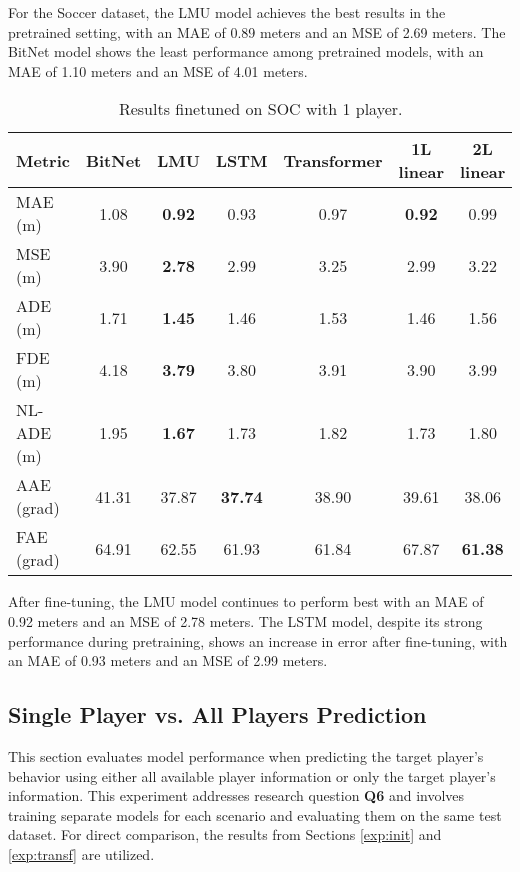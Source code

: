 For the Soccer dataset, the LMU model achieves the best results in the pretrained setting, with an MAE of 0.89 meters and an MSE of 2.69 meters. The BitNet model shows the least performance among pretrained models, with an MAE of 1.10 meters and an MSE of 4.01 meters.

\begin{table}[H]
\centering
\caption{Results finetuned on SOC with 1 player.}
\label{fine:SOC}
\begin{tabular}{l||c|c|c|c|c|c}

Metric & BitNet & LMU & LSTM & Transformer & 1L linear & 2L linear \\
\hline\hline
MAE (m) & 1.08 & \textbf{0.92} & 0.93 & 0.97 & \textbf{0.92} & 0.99 \\
MSE (m) & 3.90 & \textbf{2.78} & 2.99 & 3.25 & 2.99 & 3.22 \\
ADE (m) & 1.71 & \textbf{1.45} & 1.46 & 1.53 & 1.46 & 1.56 \\
FDE (m) & 4.18 & \textbf{3.79} & 3.80 & 3.91 & 3.90 & 3.99 \\
NL-ADE (m) & 1.95 & \textbf{1.67} & 1.73 & 1.82 & 1.73 & 1.80 \\
AAE (grad) & 41.31 & 37.87 & \textbf{37.74} & 38.90 & 39.61 & 38.06 \\
FAE (grad) & 64.91 & 62.55 & 61.93 & 61.84 & 67.87 & \textbf{61.38} \\
\end{tabular}
\end{table}

After fine-tuning, the LMU model continues to perform best with an MAE of 0.92 meters and an MSE of 2.78 meters. The LSTM model, despite its strong performance during pretraining, shows an increase in error after fine-tuning, with an MAE of 0.93 meters and an MSE of 2.99 meters.

\subsection{Single Player vs. All Players Prediction}
\label{exp:single_vs_all}

This section evaluates model performance when predicting the target player's behavior using either all available player information or only the target player's information. This experiment addresses research question \textbf{Q6} and involves training separate models for each scenario and evaluating them on the same test dataset. For direct comparison, the results from Sections \ref{exp:init} and \ref{exp:transf} are utilized.

